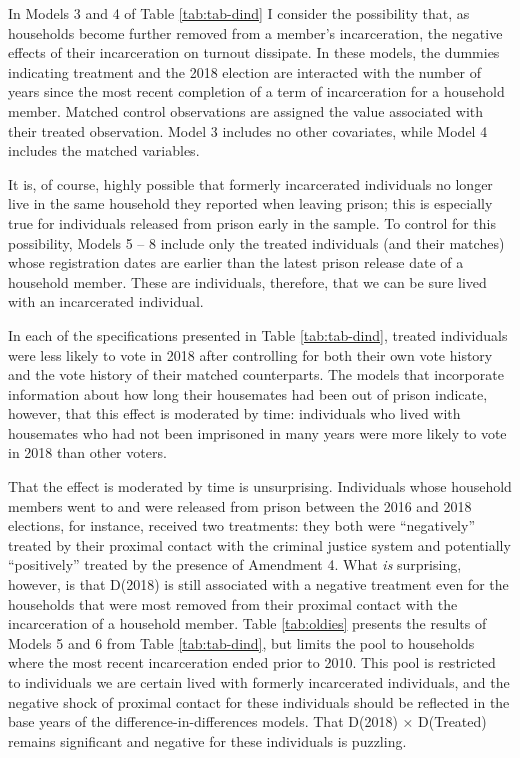 \documentclass[
  12pt,
]{article}
\begin{document}
In Models 3 and 4 of Table \ref{tab:tab-dind} I consider the possibility that, as households become further removed from a member's incarceration, the negative effects of their incarceration on turnout dissipate. In these models, the dummies indicating treatment and the 2018 election are interacted with the number of years since the most recent completion of a term of incarceration for a household member. Matched control observations are assigned the value associated with their treated observation. Model 3 includes no other covariates, while Model 4 includes the matched variables.

It is, of course, highly possible that formerly incarcerated individuals no longer live in the same household they reported when leaving prison; this is especially true for individuals released from prison early in the sample. To control for this possibility, Models 5 -- 8 include only the treated individuals (and their matches) whose registration dates are earlier than the latest prison release date of a household member. These are individuals, therefore, that we can be sure lived with an incarcerated individual.

\begin{singlespace}

\end{singlespace}

In each of the specifications presented in Table \ref{tab:tab-dind}, treated individuals were less likely to vote in 2018 after controlling for both their own vote history and the vote history of their matched counterparts. The models that incorporate information about how long their housemates had been out of prison indicate, however, that this effect is moderated by time: individuals who lived with housemates who had not been imprisoned in many years were more likely to vote in 2018 than other voters.

That the effect is moderated by time is unsurprising. Individuals whose household members went to and were released from prison between the 2016 and 2018 elections, for instance, received two treatments: they both were ``negatively'' treated by their proximal contact with the criminal justice system and potentially ``positively'' treated by the presence of Amendment 4. What \emph{is} surprising, however, is that D(2018) is still associated with a negative treatment even for the households that were most removed from their proximal contact with the incarceration of a household member. Table \ref{tab:oldies} presents the results of Models 5 and 6 from Table \ref{tab:tab-dind}, but limits the pool to households where the most recent incarceration ended prior to 2010. This pool is restricted to individuals we are certain lived with formerly incarcerated individuals, and the negative shock of proximal contact for these individuals should be reflected in the base years of the difference-in-differences models. That D(2018) × D(Treated) remains significant and negative for these individuals is puzzling.
\end{document}
